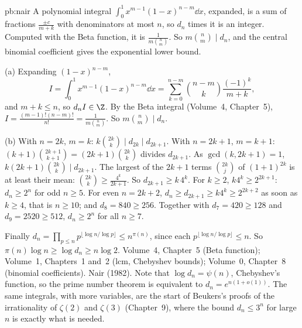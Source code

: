 \begin{solution}{pb:nair}
\idea A polynomial integral $\int_0^1x^{m-1}(1-x)^{n-m}\dd x$, expanded, is a sum of fractions $\frac{\pm c}{m+k}$ with denominators at most
$n$, so $d_n$ times it is an integer. Computed with the Beta function, it is $\frac1{m\binom nm}$. So $m\binom nm\mid d_n$, and the central
binomial coefficient gives the exponential lower bound.

\writeup (a) Expanding $(1-x)^{n-m}$,
\[
I=\int_0^1x^{m-1}(1-x)^{n-m}\dd x=\sum_{k=0}^{n-m}\binom{n-m}k\frac{(-1)^k}{m+k},
\]
and $m+k\le n$, so $d_nI\in\Z$. By the Beta integral (Volume~4, Chapter~5), $I=\frac{(m-1)!(n-m)!}{n!}=\frac1{m\binom nm}$. So $m\binom nm\mid d_n$.

(b) With $n=2k$, $m=k$: $k\binom{2k}k\mid d_{2k}\mid d_{2k+1}$. With $n=2k+1$, $m=k+1$: $(k+1)\binom{2k+1}{k+1}=(2k+1)\binom{2k}k$ divides
$d_{2k+1}$. As $\gcd(k,2k+1)=1$, $k(2k+1)\binom{2k}k\mid d_{2k+1}$. The largest of the $2k+1$ terms $\binom{2k}j$ of $(1+1)^{2k}$ is at
least their mean: $\binom{2k}k\ge\frac{4^k}{2k+1}$. So $d_{2k+1}\ge k\,4^k$. For $k\ge2$, $k4^k\ge2^{2k+1}$: $d_n\ge2^n$ for odd $n\ge5$. For
even $n=2k+2$, $d_n\ge d_{2k+1}\ge k4^k\ge2^{2k+2}$ as soon as $k\ge4$, that is $n\ge10$; and $d_8=840\ge256$. Together with
$d_7=420\ge128$ and $d_9=2520\ge512$, $d_n\ge2^n$ for all $n\ge7$.

Finally $d_n=\prod_{p\le n}p^{\lfloor\log n/\log p\rfloor}\le n^{\pi(n)}$, since each $p^{\lfloor\log n/\log p\rfloor}\le n$. So
$\pi(n)\log n\ge\log d_n\ge n\log2$.
\tools Volume~4, Chapter~5 (Beta function); Volume~1, Chapters~1 and~2 (lcm, Chebyshev bounds); Volume~0, Chapter~8 (binomial coefficients).
\leads Nair (1982). Note that $\log d_n=\psi(n)$, Chebyshev's function, so the prime number theorem is equivalent to
$d_n=e^{n(1+o(1))}$. The same integrals, with more variables, are the start of Beukers's proofs of the irrationality of $\zeta(2)$ and
$\zeta(3)$ (Chapter~9), where the bound $d_n\le3^n$ for large $n$ is exactly what is needed.
\end{solution}

